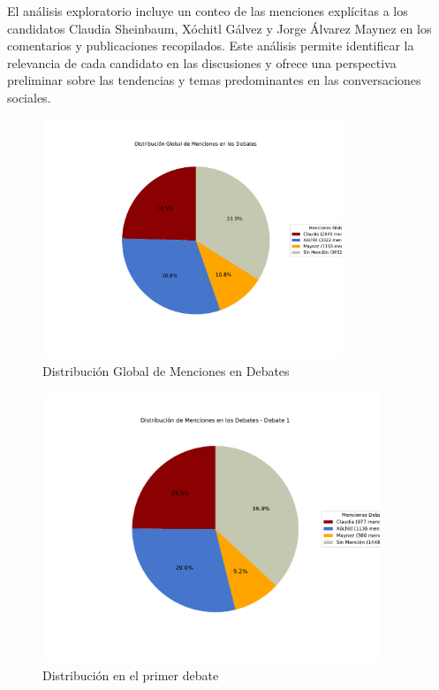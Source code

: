 \documentclass[10pt, a4paper]{article}
\begin{document}
	El análisis exploratorio incluye un conteo de las menciones explícitas a los candidatos Claudia Sheinbaum, Xóchitl Gálvez y Jorge Álvarez Maynez en los comentarios y publicaciones recopilados. Este análisis permite identificar la relevancia de cada candidato en las discusiones y ofrece una perspectiva preliminar sobre las tendencias y temas predominantes en las conversaciones sociales.
	
	\begin{figure}[h!]
		\centering
		\includegraphics[width=0.8\textwidth]{grafica_global_debates.pdf} %
		\vspace{-15mm}
		\caption{Distribución Global de Menciones en Debates}
		\label{fig:globalDebates} %
	\end{figure}
	
	
	\newpage
	\begin{figure}[h!]
		\centering
		\includegraphics[width=0.9\textwidth]{grafica_debate1.pdf} %
		\vspace{-15mm}
		\caption{Distribución en el primer debate}
		\label{fig:distrDebate1} %
	\end{figure}
	
\end{document}
